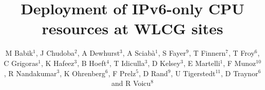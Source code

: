 \documentclass[a4paper]{jpconf}
\begin{document}
\title{Deployment of IPv6-only CPU resources at WLCG sites}


\author{M Babik$^1$, J Chudoba$^2$, A Dewhurst$^3$, A Sciab\`a$^1$, S
  Fayer$^9$, T Finnern$^7$, T Froy$^6$, C Grigoras$^1$, K Hafeez$^3$,
  B Hoeft$^4$, T Idiculla$^3$, D Kelsey$^3$, E Martelli$^1$, F
  Munoz$^{10}$, R Nandakumar$^3$, K Ohrenberg$^6$, F Prelz$^5$, D
  Rand$^9$, U Tigerstedt$^{11}$, D Traynor$^6$ and R Voicu$^8$}

\address{$^1$ CERN, CH-1211 Gen\`{e}ve 23, Switzerland}
\address{$^2$ Institute of Physics, Academy of Sciences of the Czech
  Republic Na Slovance 2 182 21 Prague 8, Czech Republic}
\address{$^3$ STFC - Rutherford Appleton Lab. UK}
\address{$^4$ Karlsruher Institut f\"{u}r Technologie,
  Hermann-von-Helmholtz-Platz 1, D-76344 Eggenstein-Leopoldshafen,
  Germany}
\address{$^5$ INFN, Sezione di Milano, via G. Celoria 16, I-20133
  Milano, Italy}
\address{$^6$ Queen Mary University of London, Mile End Road, London
  E1 4NS, United Kingdom}
\address{$^7$ Deutsches Elektronen-Synchrotron, Notkestra{\ss}e 85,
  D-22607 Hamburg, Germany}
\address{$^8$ California Institute of Technology, Pasadena, Ca 91125,
  U.S.A.}
\address{$^9$ Imperial College London, South Kensington Campus, London
  SW7 2AZ, United Kingdom}
\address{$^{10}$ Port d’Informaci\'{o} Cient\'{i}fica (PIC),
  Universitat Aut\`{o}noma de Barcelona, Bellaterra (Barcelona),
  Spain}
\address{$^{11}$ CSC Tieteen Tietotekniikan Keskus Oy, P.O. Box 405,
  FI-02101 Espoo, Finland}
\end{document}
